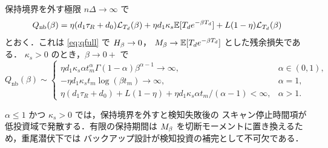 \begin{theorem}[保持境界なし残余損失の相転移]
保持境界を外す極限 $n\Delta\to\infty$ で
\[
  Q_{\mathrm{nb}}(\beta)
  =\eta(d_1\tau_R+d_0)\mathcal{L}_{T_d}(\beta)
  +\eta d_1\kappa_s\mathbb{E}[T_de^{-\beta T_d}]
  +L(1-\eta)\mathcal{L}_{T_d}(\beta)
\]
とおく．これは \eqref{eq:qfull} で $H_\beta\to0$，
$M_\beta\to\mathbb{E}[T_de^{-\beta T_d}]$ とした残余損失である．
$\kappa_s>0$ のとき，$\beta\to0+$ で
\[
Q_{\mathrm{nb}}(\beta)\sim
\begin{cases}
\eta d_1\kappa_s\alpha t_m^\alpha\Gamma(1-\alpha)\beta^{\alpha-1}\to\infty,
& \alpha\in(0,1),\\
-\eta d_1\kappa_s t_m\log(\beta t_m)\to\infty,& \alpha=1,\\
\eta(d_1\tau_R+d_0)+L(1-\eta)
+\eta d_1\kappa_s\alpha t_m/(\alpha-1)<\infty,& \alpha>1.
\end{cases}
\]
\end{theorem}

\begin{remark}
$\alpha\le1$ かつ $\kappa_s>0$ では，保持境界を外すと検知失敗後の
スキャン停止時間項が低投資域で発散する．有限の保持期間は
$M_\beta$ を切断モーメントに置き換えるため，重尾潜伏下では
バックアップ設計が検知投資の補完として不可欠である．
\end{remark}
